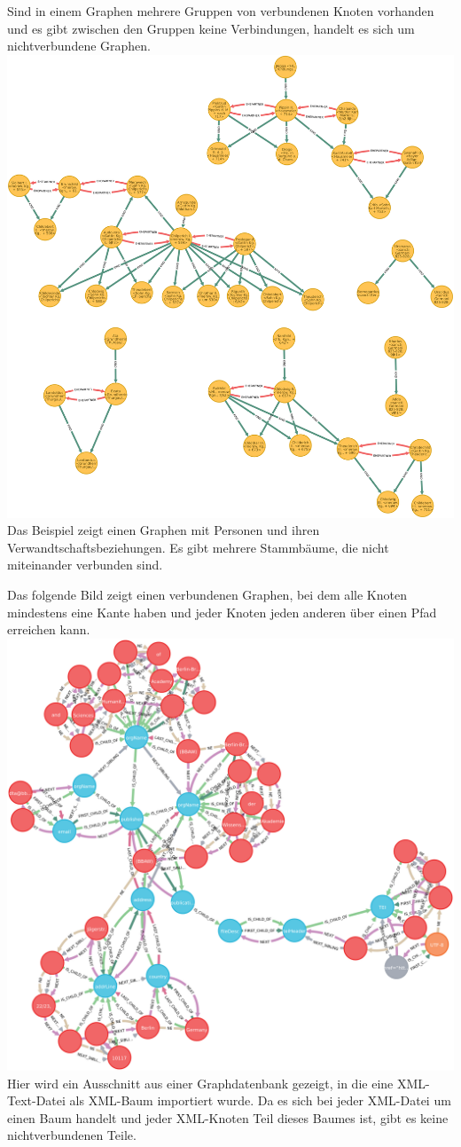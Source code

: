 \documentclass[12pt,ngerman,]{article}
\begin{document}
Sind in einem Graphen mehrere Gruppen von verbundenen Knoten vorhanden
und es gibt zwischen den Gruppen keine Verbindungen, handelt es sich um
nichtverbundene Graphen. \includegraphics{Bilder/disconnectedGraph.png}
Das Beispiel zeigt einen Graphen mit Personen und ihren
Verwandtschaftsbeziehungen. Es gibt mehrere Stammbäume, die nicht
miteinander verbunden sind.

Das folgende Bild zeigt einen verbundenen Graphen, bei dem alle Knoten
mindestens eine Kante haben und jeder Knoten jeden anderen über einen
Pfad erreichen kann. \includegraphics{Bilder/connectedGraph.png} Hier
wird ein Ausschnitt aus einer Graphdatenbank gezeigt, in die eine
XML-Text-Datei als XML-Baum importiert wurde. Da es sich bei jeder
XML-Datei um einen Baum handelt und jeder XML-Knoten Teil dieses Baumes
ist, gibt es keine nichtverbundenen Teile.
\end{document}
